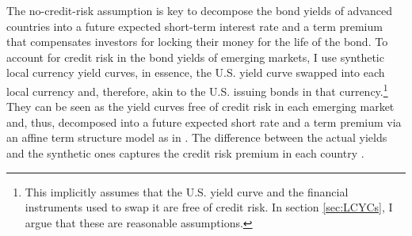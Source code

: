 {%
The no-credit-risk assumption is key to decompose the bond yields of advanced countries into a future expected short-term interest rate and a term premium that compensates investors for locking their money for the life of the bond. 
To account for credit risk in the bond yields of emerging markets, I use synthetic local currency yield curves, in essence, the U.S. yield curve swapped into each local currency and,
therefore, akin to the U.S. issuing bonds in that currency.\footnote{ This implicitly assumes that the U.S. yield curve and the financial instruments used to swap it are free of credit risk. In section \ref{sec:LCYCs}, I argue that these are reasonable assumptions.}
They can be seen as the yield curves free of credit risk in each emerging market and, thus, decomposed into a 
future expected short rate and a term premium via an affine term structure model as in \cite{CochranePiazzesi:2008}. 
The difference between the actual yields and the synthetic ones captures the credit risk premium in each country \citep{DuSchreger:2016JoF}.

}
